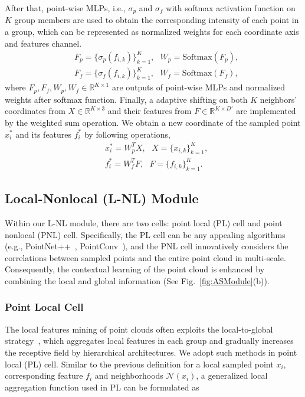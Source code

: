 \documentclass[10pt,twocolumn,letterpaper]{article}
\begin{document}
	After that, point-wise MLPs, i.e., $\sigma_p$ and $\sigma_f$ with softmax activation function on $K$ group members are used to obtain the corresponding intensity of each point in a group, which can be represented as normalized weights for each coordinate axis and features channel.
	\begin{equation}
	\begin{split}
	&{F_p} = \{\sigma_{p}(f_{i,k})\}_{k=1}^K, ~~~{W}_p =  \text{Softmax}({F_p}),\\
	&{F_f} = \{\sigma_{f}(f_{i,k})\}_{k=1}^K, ~~~{W}_f =  \text{Softmax}({F_f}),
	\end{split}
	\end{equation}
	where ${F_p}, {F_f}, {W}_p, {W}_f \in \mathbb{R}^{K\times 1}$ are outputs of point-wise MLPs and normalized weights after softmax function. Finally, a adaptive shifting on both $K$ neighbors' coordinates from ${X}\in \mathbb{R}^{K\times 3}$ and their features from ${F}\in \mathbb{R}^{K\times D'}$ are implemented by the weighted sum operation. We obtain a new coordinate of the sampled point $x^*_i$ and its features $f^*_i$ by following operations,
	\begin{equation}
	\begin{split}
	&x^*_i =  {W}_p^T {X}, ~~~{X}=\{x_{i,k}\}_{k=1}^K,\\
	&f^*_i =  {W}_f^T {F}, ~~~{F}=\{f_{i,k}\}_{k=1}^K.
	\end{split}
	\end{equation}
	
	
	\subsection{Local-Nonlocal (L-NL) Module}
	\label{NL}
	Within our L-NL module, there are two cells: point local (PL) cell and point nonlocal (PNL) cell. Specifically, the PL cell can be any appealing algorithms (e.g., PointNet++~\cite{pointnet2}, PointConv~\cite{PointConv}), and the PNL cell innovatively considers the correlations between sampled points and the entire point cloud in multi-scale. Consequently, the contextual learning of the point cloud is enhanced by combining the local and global information (See Fig.~\ref{fig:ASModule}(b)).
	
	\subsubsection{Point Local Cell} 
	
	The local features mining of point clouds often exploits the local-to-global strategy~\cite{pointnet2}, which aggregates local features in each group and gradually increases the receptive field by hierarchical architectures. We adopt such methods in point local (PL) cell. Similar to the previous definition for a local sampled point $x_i$, corresponding feature $f_i$ and neighborhoods $\mathcal{N}(x_i)$, a generalized local aggregation function used in PL can be formulated as
	
\end{document}

